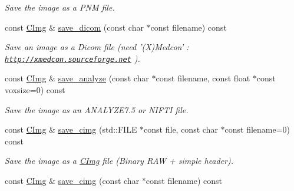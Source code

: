 \begin{DoxyCompactItemize}
\begin{DoxyCompactList}\small\item\em Save the image as a PNM file. \item\end{DoxyCompactList}\item 
\hypertarget{structcimg__library_1_1_c_img_ad442714fe10a5135688f023b2a00cb29}{
const \hyperlink{structcimg__library_1_1_c_img}{CImg} \& \hyperlink{structcimg__library_1_1_c_img_ad442714fe10a5135688f023b2a00cb29}{save\_\-dicom} (const char $\ast$const filename) const }
\label{structcimg__library_1_1_c_img_ad442714fe10a5135688f023b2a00cb29}

\begin{DoxyCompactList}\small\item\em Save an image as a Dicom file (need '(X)Medcon' : \href{http://xmedcon.sourceforge.net}{\tt http://xmedcon.sourceforge.net} ). \item\end{DoxyCompactList}\item 
\hypertarget{structcimg__library_1_1_c_img_a29f58c110f5e216e4fa457bbb343aab2}{
const \hyperlink{structcimg__library_1_1_c_img}{CImg} \& \hyperlink{structcimg__library_1_1_c_img_a29f58c110f5e216e4fa457bbb343aab2}{save\_\-analyze} (const char $\ast$const filename, const float $\ast$const voxsize=0) const }
\label{structcimg__library_1_1_c_img_a29f58c110f5e216e4fa457bbb343aab2}

\begin{DoxyCompactList}\small\item\em Save the image as an ANALYZE7.5 or NIFTI file. \item\end{DoxyCompactList}\item 
\hypertarget{structcimg__library_1_1_c_img_a34e0be5beb5d91caa5ae59ee2e039aa4}{
const \hyperlink{structcimg__library_1_1_c_img}{CImg} \& \hyperlink{structcimg__library_1_1_c_img_a34e0be5beb5d91caa5ae59ee2e039aa4}{save\_\-cimg} (std::FILE $\ast$const file, const char $\ast$const filename=0) const }
\label{structcimg__library_1_1_c_img_a34e0be5beb5d91caa5ae59ee2e039aa4}

\begin{DoxyCompactList}\small\item\em Save the image as a \hyperlink{structcimg__library_1_1_c_img}{CImg} file (Binary RAW + simple header). \item\end{DoxyCompactList}\item 
\hypertarget{structcimg__library_1_1_c_img_ae2b66c0e3dd50e8b7cd33f97fa4b45cf}{
const \hyperlink{structcimg__library_1_1_c_img}{CImg} \& \hyperlink{structcimg__library_1_1_c_img_ae2b66c0e3dd50e8b7cd33f97fa4b45cf}{save\_\-cimg} (const char $\ast$const filename) const }
\label{structcimg__library_1_1_c_img_ae2b66c0e3dd50e8b7cd33f97fa4b45cf}


\end{DoxyCompactItemize}
